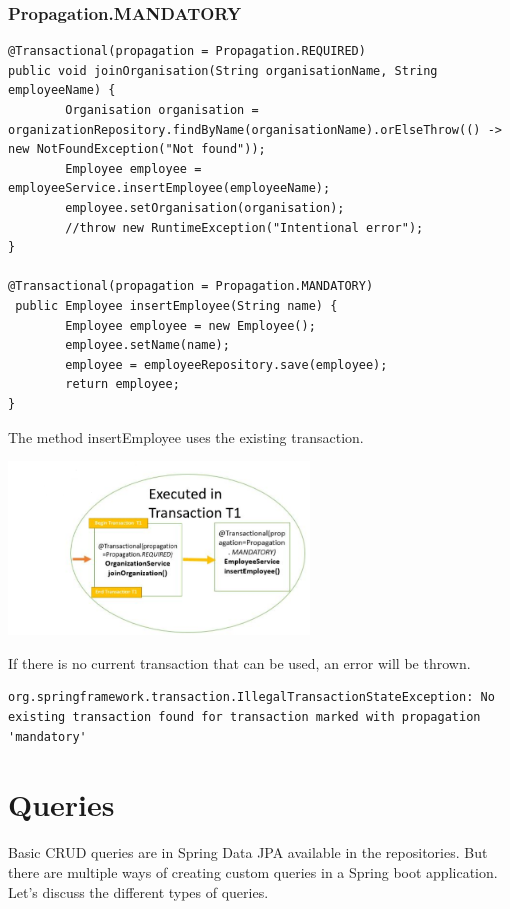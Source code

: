 \subsubsection{Propagation.MANDATORY}

\begin{lstlisting}
@Transactional(propagation = Propagation.REQUIRED)
public void joinOrganisation(String organisationName, String employeeName) {
        Organisation organisation = organizationRepository.findByName(organisationName).orElseThrow(() -> new NotFoundException("Not found"));
        Employee employee = employeeService.insertEmployee(employeeName);
        employee.setOrganisation(organisation);
        //throw new RuntimeException("Intentional error");
}

@Transactional(propagation = Propagation.MANDATORY)
 public Employee insertEmployee(String name) {
        Employee employee = new Employee();
        employee.setName(name);
        employee = employeeRepository.save(employee);
        return employee;
}
\end{lstlisting}

The method insertEmployee uses the existing transaction.

\includegraphics[width=8cm]{./images/jpa/transaction_propagation_6}

 If there is no current transaction that can be used, an error will be thrown. 

\begin{verbatim}
org.springframework.transaction.IllegalTransactionStateException: No existing transaction found for transaction marked with propagation 'mandatory'
\end{verbatim}

\section{Queries}

Basic CRUD queries are in Spring Data JPA available in the repositories. But there are multiple ways of creating custom queries in a Spring boot application. Let's discuss the different types of queries.

